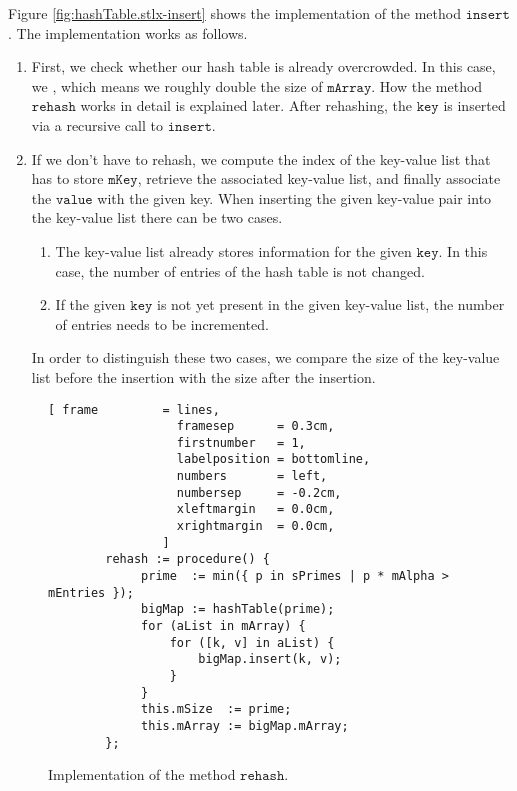 Figure \ref{fig:hashTable.stlx-insert} shows the implementation of the method $\mathtt{insert}$.
The implementation works as follows.
\begin{enumerate}
\item First, we check whether our hash table is already overcrowded.
      In this case, we , which means we roughly double the size of $\mathtt{mArray}$.
      How the method $\mathtt{rehash}$ works in detail is explained later.
      After rehashing, the $\mathtt{key}$ is inserted via a recursive call to $\mathtt{insert}$.
\item If we don't have to rehash, we compute the index of the key-value list that has to store
      $\mathtt{mKey}$, retrieve the associated key-value list, and finally associate the
      $\mathtt{value}$ with the given key.  When inserting the given key-value
      pair into the key-value list there can be two cases.
      \begin{enumerate}
      \item The key-value list already stores information for the given $\mathtt{key}$.
            In this case, the number of entries of the hash table is not changed.
      \item If the given $\mathtt{key}$ is not yet present in the given key-value list,
            the number of entries needs to be incremented.
      \end{enumerate}
      In order to distinguish these two cases, we compare the size of the key-value list before
      the insertion with the size after the insertion.     
\end{enumerate}


\begin{figure}[!ht]
\centering
\begin{Verbatim}[ frame         = lines, 
                  framesep      = 0.3cm, 
                  firstnumber   = 1,
                  labelposition = bottomline,
                  numbers       = left,
                  numbersep     = -0.2cm,
                  xleftmargin   = 0.0cm,
                  xrightmargin  = 0.0cm,
                ]
        rehash := procedure() {
             prime  := min({ p in sPrimes | p * mAlpha > mEntries });
             bigMap := hashTable(prime);
             for (aList in mArray) {
                 for ([k, v] in aList) {
                     bigMap.insert(k, v);
                 }    
             }
             this.mSize  := prime;
             this.mArray := bigMap.mArray;
        };
\end{Verbatim}
\vspace*{-0.3cm}
\caption{Implementation of the method $\mathtt{rehash}$.}
\label{fig:hashTable.stlx-rehash}
\end{figure}


